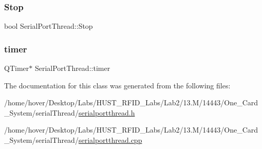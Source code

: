 \mbox{\label{class_serial_port_thread_ac859512ec7787398c77158a2f63e9be0}} 
\subsubsection{\texorpdfstring{Stop}{Stop}}
{\footnotesize\ttfamily bool Serial\+Port\+Thread\+::\+Stop\hspace{0.3cm}{\ttfamily [private]}}

\mbox{\label{class_serial_port_thread_aa1f0f4cbedd58026fb8a050aa013bcfa}} 
\subsubsection{\texorpdfstring{timer}{timer}}
{\footnotesize\ttfamily Q\+Timer$\ast$ Serial\+Port\+Thread\+::timer\hspace{0.3cm}{\ttfamily [private]}}



The documentation for this class was generated from the following files\+:\begin{DoxyCompactItemize}
\item 
/home/hover/\+Desktop/\+Labs/\+H\+U\+S\+T\+\_\+\+R\+F\+I\+D\+\_\+\+Labs/\+Lab2/13.\+M/14443/\+One\+\_\+\+Card\+\_\+\+System/serial\+Thread/\mbox{\hyperlink{serialportthread_8h}{serialportthread.\+h}}\item 
/home/hover/\+Desktop/\+Labs/\+H\+U\+S\+T\+\_\+\+R\+F\+I\+D\+\_\+\+Labs/\+Lab2/13.\+M/14443/\+One\+\_\+\+Card\+\_\+\+System/serial\+Thread/\mbox{\hyperlink{serialportthread_8cpp}{serialportthread.\+cpp}}\end{DoxyCompactItemize}

